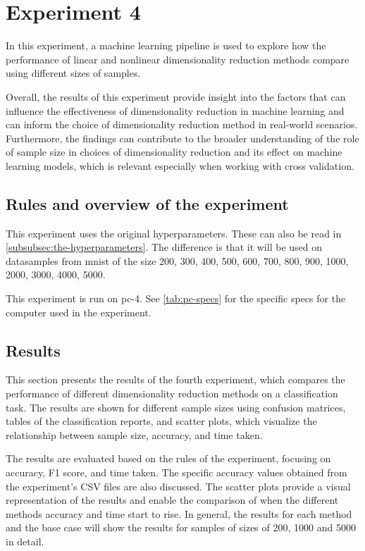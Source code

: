\section{Experiment 4}\label{sec:experiment-4}

In this experiment, a machine learning pipeline is used to explore how the performance of linear and nonlinear dimensionality reduction methods compare using different sizes of samples.

Overall, the results of this experiment provide insight into the factors that can influence the effectiveness of dimensionality reduction in machine learning and can inform the choice of dimensionality reduction method in real-world scenarios. Furthermore, the findings can contribute to the broader understanding of the role of sample size in choices of dimensionality reduction and its effect on machine learning models, which is relevant especially when working with cross validation.

\subsection{Rules and overview of the experiment}
This experiment uses the original hyperparameters. These can also be read in \autoref{subsubsec:the-hyperparameters}. The difference is that it will be used on datasamples from \gls{mnist} of the size 200, 300, 400, 500, 600, 700, 800, 900, 1000, 2000, 3000, 4000, 5000.

This experiment is run on pc-4. See \autoref{tab:pc-specs} for the specific specs for the computer used in the experiment.


\subsection{Results}\label{subsec:experiment_4_results}
This section presents the results of the fourth experiment, which compares the performance of different dimensionality reduction methods on a classification task. The results are shown for different sample sizes using confusion matrices, tables of the classification reports, and scatter plots, which visualize the relationship between sample size, accuracy, and time taken.

The results are evaluated based on the rules of the experiment, focusing on accuracy, F1 score, and time taken. The specific accuracy values obtained from the experiment's CSV files are also discussed. The scatter plots provide a visual representation of the results and enable the comparison of when the different methods accuracy and time start to rise. In general, the results for each method and the base case will show the results for samples of sizes of 200, 1000 and 5000 in detail.

